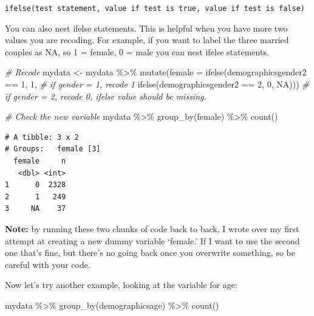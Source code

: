 \documentclass[
]{book}
\newenvironment{Shaded}{\begin{snugshade}}{\end{snugshade}}
\newcommand{\AttributeTok}[1]{\textcolor[rgb]{0.77,0.63,0.00}{#1}}
\newcommand{\CommentTok}[1]{\textcolor[rgb]{0.56,0.35,0.01}{\textit{#1}}}
\newcommand{\ConstantTok}[1]{\textcolor[rgb]{0.00,0.00,0.00}{#1}}
\newcommand{\DecValTok}[1]{\textcolor[rgb]{0.00,0.00,0.81}{#1}}
\newcommand{\FunctionTok}[1]{\textcolor[rgb]{0.00,0.00,0.00}{#1}}
\newcommand{\NormalTok}[1]{#1}
\newcommand{\OtherTok}[1]{\textcolor[rgb]{0.56,0.35,0.01}{#1}}
\newcommand{\SpecialCharTok}[1]{\textcolor[rgb]{0.00,0.00,0.00}{#1}}
\begin{document}
\texttt{ifelse(test\ statement,\ value\ if\ test\ is\ true,\ value\ if\ test\ is\ false)}

You can also nest ifelse statements. This is helpful when you have more two values you are recoding. For example, if you want to label the three married couples as NA, so 1 = female, 0 = male you can nest ifelse statements.

\begin{Shaded}
\begin{Highlighting}[]
\CommentTok{\# Recode}
\NormalTok{mydata }\OtherTok{\textless{}{-}}\NormalTok{ mydata }\SpecialCharTok{\%\textgreater{}\%}
  \FunctionTok{mutate}\NormalTok{(}\AttributeTok{female =} \FunctionTok{ifelse}\NormalTok{(demographicsgender2 }\SpecialCharTok{==} \DecValTok{1}\NormalTok{, }\DecValTok{1}\NormalTok{, }\CommentTok{\# if gender = 1, recode 1}
                         \FunctionTok{ifelse}\NormalTok{(demographicsgender2 }\SpecialCharTok{==} \DecValTok{2}\NormalTok{, }\DecValTok{0}\NormalTok{, }\ConstantTok{NA}\NormalTok{))) }\CommentTok{\# if gender = 2, recode 0, ifelse value should be missing.}

\CommentTok{\# Check the new variable }
\NormalTok{mydata }\SpecialCharTok{\%\textgreater{}\%}
  \FunctionTok{group\_by}\NormalTok{(female) }\SpecialCharTok{\%\textgreater{}\%}
  \FunctionTok{count}\NormalTok{()}
\end{Highlighting}
\end{Shaded}

\begin{verbatim}
# A tibble: 3 x 2
# Groups:   female [3]
  female     n
   <dbl> <int>
1      0  2328
2      1   249
3     NA    37
\end{verbatim}

\textbf{Note:} by running these two chunks of code back to back, I wrote over my first attempt at creating a new dummy variable `female.' If I want to use the second one that's fine, but there's no going back once you overwrite something, so be careful with your code.

Now let's try another example, looking at the variable for age:

\begin{Shaded}
\begin{Highlighting}[]
\NormalTok{mydata }\SpecialCharTok{\%\textgreater{}\%}
  \FunctionTok{group\_by}\NormalTok{(demographicsage) }\SpecialCharTok{\%\textgreater{}\%}
  \FunctionTok{count}\NormalTok{()}
\end{Highlighting}
\end{Shaded}
\end{document}
